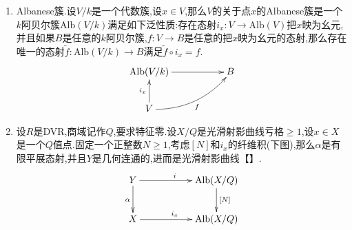 \begin{enumerate}
\begin{proof}
    	\qquad
    	
    	设$Y'_K$是光滑射影曲线,使得它的函数域是$K(Y_K)/K(X_K)$的Galois闭包.那么Galois群$G$就作用在$Y_K'\to X_K$上.态射$Y_K'\to X_K$是有限的并且在$X_K\backslash D_K$上是一个对应的群为$G$的Galois覆盖.取$\mathcal{\mathscr{O}_K}$在$K(Y_K')$中的正规化为$\widetilde{\mathcal{Y}_{\mathscr{O}_K}}$,那么这个正规化是有限态射(整excellent概形在函数域的有限扩张中的正规化是有限的).于是$\widetilde{\mathcal{Y}_{\mathscr{O}_K}}\to\mathcal{Y}_{\mathscr{O}_K}\to\mathcal{X}_{\mathscr{O}_K}$是$\mathcal{S}_{\mathcal{X}_{\mathscr{O}_K},D_K}$中的对象,并且它的一般纤维是$Y'_K\to X_K$.
    	
    	\qquad
    	
    	【设$S$是戴德金概形,函数域记作$K$,设$X/K$是整射影概形,设有限群$G$作用在概形$X$上,设$\mathcal{X}$是$X$的关于$S$的模型,那么在那些兼容$G$作用并且控制了$\mathcal{X}$的$X$的模型中存在最小元$\mathcal{Z}$(也即对任意满足这个条件的模型$\mathcal{W}$,都存在模型的态射$\mathcal{W}\to\mathcal{Z}$),并且存在模型态射$\mathcal{Z}\to\mathcal{X}$诱导了一般纤维上的同构】
    	
    	\qquad
    	
    	于是可以找到$Y_K'$在$\mathscr{O}_K$上的模型$\mathcal{Y}'_{\mathscr{O}_K}$,延拓了$Y'_K$上的$G$作用,并且存在态射$\varphi_{\mathscr{O}_K}:\mathcal{Y}'_{\mathscr{O}_K}\to\mathcal{Y}_{\mathscr{O}_K}$使得它在一般纤维上是同构.
    	
    	\qquad
    	
    	记$\pi'_{\mathscr{O}_K}=\pi_{\mathscr{O}_K}\circ\varphi_{\mathscr{O}_K}:\mathcal{Y}'_{\mathscr{O}_K}\to\mathcal{Y}_{\mathscr{O}_K}\to\mathcal{X}_{\mathscr{O}_K}$.按照$\mathcal{Y}'_{\mathscr{O}_K}$是既约的,从$\pi'_{\mathscr{O}_K}$的一般纤维的$G$不变性得到$\pi'_{\mathscr{O}_K}$的$G$不变性【?】.最后取$\mathcal{Y}'=\mathcal{Y}'_{\mathscr{O}_K}\otimes_{\mathscr{O}_K}\overline{\mathbb{Z}_p}$和$\pi'=\pi'_{\mathscr{O}_K}\otimes_{\mathscr{O}_K}\overline{\mathbb{Z}_p}:\mathcal{Y}'\to\mathcal{X}$.那么$\pi'$就是$\Sigma_{\mathcal{X},D}$的对象,并且如果取$\varphi=\varphi_{\mathscr{O}_K}\otimes_{\mathscr{O}_K}\overline{\mathbb{Z}_p}:\mathcal{Y}'\to\mathcal{Y}$,就有$\pi\circ\varphi=\pi'$.
    \end{proof}
    \item Albanese簇.设$V/k$是一个代数簇,设$x\in V$,那么$V$的关于点$x$的Albanese簇是一个$k$阿贝尔簇$\mathrm{Alb}(V/k)$满足如下泛性质:存在态射$i_x:V\to\mathrm{Alb}(V)$把$x$映为幺元,并且如果$B$是任意的$k$阿贝尔簇,$f:V\to B$是任意的把$x$映为幺元的态射,那么存在唯一的态射$\widetilde{f}:\mathrm{Alb}(V/k)\to B$满足$\widetilde{f}\circ i_x=f$.
    $$\xymatrix{\mathrm{Alb}(V/k)\ar[rr]&&B\\V\ar[u]^{i_x}\ar@/_1pc/[urr]_f&&}$$
    \item 设$R$是DVR,商域记作$Q$,要求特征零.设$X/Q$是光滑射影曲线亏格$\ge1$,设$x\in X$是一个$Q$值点.固定一个正整数$N\ge1$,考虑$[N]$和$i_x$的纤维积(下图),那么$\alpha$是有限平展态射,并且$Y$是几何连通的,进而是光滑射影曲线【】.
    $$\xymatrix{Y\ar[rr]^i\ar[d]_{\alpha}&&\mathrm{Alb}(X/Q)\ar[d]^{[N]}\\X\ar[rr]^{i_x}&&\mathrm{Alb}(X/Q)}$$
    

\end{enumerate}

